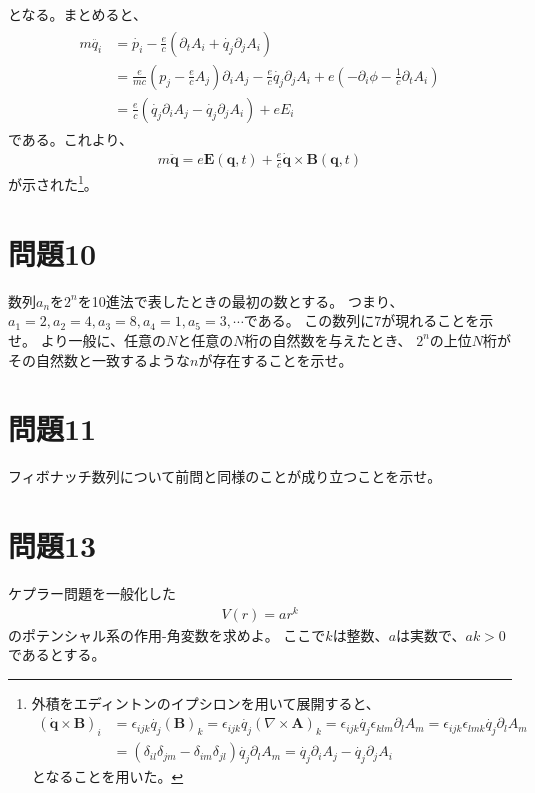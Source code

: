 \documentclass{jsarticle}
\begin{document}
となる。まとめると、
\begin{align}
\begin{split}
m\ddot{q_{i}}&=\dot{p_{i}}-\frac{e}{c}\left(\partial_{t}A_{i}+\dot{q_{j}}\partial_{j}A_{i}\right)\\
&=\frac{e}{mc}\left(p_{j}
-\frac{e}{c}A_{j}\right)\partial_{i}A_{j}
-\frac{e}{c}\dot{q_{j}}\partial_{j}A_{i}
+e\left(-\partial_{i}\phi-\frac{1}{c}\partial_{t}A_{i}\right)\\
&=\frac{e}{c}\left(\dot{q_{j}}\partial_{i}A_{j}-\dot{q_{j}}\partial_{j}A_{i}\right)+eE_{i}
\end{split}
\end{align}
である。これより、
\begin{align}
m\ddot{\pmb{q}}=e\pmb{E}(\pmb{q},t)+\frac{e}{c}\dot{\pmb{q}}\times\pmb{B}(\pmb{q},t)
\end{align}
が示された\footnote{
外積をエディントンのイプシロンを用いて展開すると、
\begin{align*}
(\dot{\pmb{q}}\times\pmb{B})_{i}&=\epsilon_{ijk}\dot{q_{j}}(\pmb{B})_{k}
=\epsilon_{ijk}\dot{q_{j}}(\nabla\times\pmb{A})_{k}
=\epsilon_{ijk}\dot{q_{j}}\epsilon_{klm}\partial_{l}A_{m}
=\epsilon_{ijk}\epsilon_{lmk}\dot{q_{j}}\partial_{l}A_{m}\\
&=\left(\delta_{il}\delta_{jm}-\delta_{im}\delta_{jl}\right)\dot{q_{j}}\partial_{l}A_{m}
=\dot{q_{j}}\partial_{i}A_{j}-\dot{q_{j}}\partial_{j}A_{i}
\end{align*}
となることを用いた。
}。


\section*{問題10}
\begin{shaded}
数列$a_{n}$を$2^{n}$を10進法で表したときの最初の数とする。
つまり、$a_{1}=2,a_{2}=4,a_{3}=8,a_{4}=1,a_{5}=3,\cdots$である。
この数列に$7$が現れることを示せ。
より一般に、任意の$N$と任意の$N$桁の自然数を与えたとき、
$2^{n}$の上位$N$桁がその自然数と一致するような$n$が存在することを示せ。
\end{shaded}



\section*{問題11}
\begin{shaded}
フィボナッチ数列について前問と同様のことが成り立つことを示せ。
\end{shaded}
\section*{問題13}
\begin{shaded}
ケプラー問題を一般化した
\begin{align}
V(r)=ar^{k}
\end{align}
のポテンシャル系の作用-角変数を求めよ。
ここで$k$は整数、$a$は実数で、$ak>0$であるとする。
\end{shaded}
\end{document}
